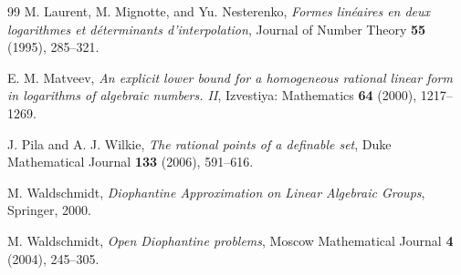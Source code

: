 \documentclass[11pt,oneside]{article}
\theoremstyle{definition}
\begin{document}
\begin{thebibliography}{99}
M. Laurent, M. Mignotte, and Yu. Nesterenko,
\emph{Formes lin\'eaires en deux logarithmes et d\'eterminants d'interpolation},
Journal of Number Theory \textbf{55} (1995), 285--321.

E. M. Matveev,
\emph{An explicit lower bound for a homogeneous rational linear form in logarithms of algebraic numbers. II},
Izvestiya: Mathematics \textbf{64} (2000), 1217--1269.

J. Pila and A. J. Wilkie,
\emph{The rational points of a definable set},
Duke Mathematical Journal \textbf{133} (2006), 591--616.

M. Waldschmidt,
\emph{Diophantine Approximation on Linear Algebraic Groups},
Springer, 2000.

M. Waldschmidt,
\emph{Open Diophantine problems},
Moscow Mathematical Journal \textbf{4} (2004), 245--305.

\end{thebibliography}
\end{document}

